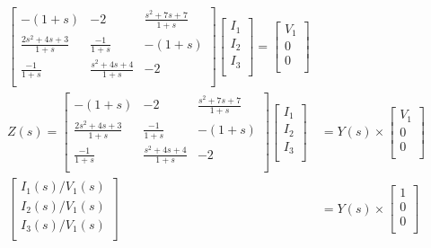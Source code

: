 \documentclass[10pt]{article}
\begin{document}
\begin{align*}
    \begin{bmatrix}
    -(1+s)&               -2 &               \frac{s^2+7s+7}{1+s}\\ 
      \frac{2s^2+4s+3}{1+s}& \frac{-1}{1+s}&          -(1+s)\\
     \frac{-1}{1+s}&             \frac{s^2+4s+4}{1+s}& -2\\
    \end{bmatrix} 
    \begin{bmatrix}
    I_1 \\ I_2 \\ I_3 \\
    \end{bmatrix}
    = \begin{bmatrix}
    V_1 \\ 0 \\ 0\\
    \end{bmatrix}\\
    Z(s) = \begin{bmatrix}
    -(1+s)&               -2 &               \frac{s^2+7s+7}{1+s}\\ 
      \frac{2s^2+4s+3}{1+s}& \frac{-1}{1+s}&          -(1+s)\\
     \frac{-1}{1+s}&             \frac{s^2+4s+4}{1+s}& -2\\
    \end{bmatrix} 
        \begin{bmatrix}
    I_1 \\ I_2 \\ I_3 \\
    \end{bmatrix} &= Y(s) \times \begin{bmatrix}
    V_1 \\ 0 \\ 0\\
    \end{bmatrix}\\
            \begin{bmatrix}
    I_1(s)/V_1(s) \\ I_2(s)/V_1(s) \\ I_3(s)/V_1(s) \\
    \end{bmatrix} &= Y(s)\times \begin{bmatrix}
    1 \\ 0 \\ 0\\
    \end{bmatrix}\\
\end{align*}
\end{document}
